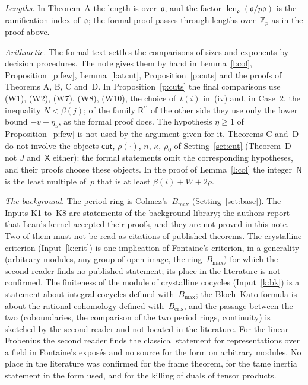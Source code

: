 \documentclass[11pt,a4paper]{article}
\newcommand{\m}[1]{\mbox{$#1$}}        %
\theoremstyle{plainx}
\theoremstyle{uprightx}
\providecommand{\Zp}{\mathbb{Z}_p}\providecommand{\Qp}{\mathbb{Q}_p}\providecommand{\GQp}{G_{\mathbb{Q}_p}}
\providecommand{\fo}{\mathfrak{o}}\providecommand{\fc}{\mathfrak{c}}\providecommand{\fd}{\mathfrak{d}}
\begin{document}
\emph{Lengths.} In Theorem~A the length is over~$\fo$, and the factor $\operatorname{len}_{\fo}(\fo/p\fo)$
is the ramification index of~$\fo$; the formal proof passes through lengths over~$\Zp$ as in the proof above.

\emph{Arithmetic.} The formal text settles the comparisons of sizes and exponents by decision procedures.
The note gives them by hand in Lemma~\ref{l:col}, Proposition~\ref{p:few}, Lemma~\ref{l:atcut},
Proposition~\ref{p:cuts} and the proofs of Theorems A, B, C and~D. In Proposition~\ref{p:cuts} the final
comparisons use (W1), (W2), (W7), (W8), (W10), the choice of~\m{t(i)} in~(iv) and, in Case~2, the inequality
\m{N<\beta(j)}; of the family \m{\mathsf{R}^{\epsilon'}} of the other side they use only the lower bound
\m{-v-\eta_\nu}, as the formal proof does. The hypothesis \m{\eta\ge1} of Proposition~\ref{p:few} is not
used by the argument given for it. Theorems C and~D do not involve the objects
$\mathsf{cut}$, $\rho(\cdot)$, $n$, $\kappa$, $\rho_0$ of Setting~\ref{set:cut} (Theorem~D not $J$ and~$\mathsf{X}$
either): the formal statements omit the corresponding hypotheses, and their proofs choose these objects. In the proof of Lemma~\ref{l:col} the integer~$\mathsf{N}$ is the least
multiple of~$p$ that is at least \m{\beta(i)+W+2\rho}.

\emph{The background.} The period ring is Colmez's~$B_{\max}$ (Setting~\ref{set:base}). The Inputs K1
to~K8 are statements of the background library; the authors report that Lean's kernel accepted their proofs,
and they are not proved in this note. Two of them must not be read as citations of published theorems.
The crystalline criterion (Input~\ref{k:crit}) is one implication of Fontaine's criterion, in a generality
(arbitrary modules, any group of open image, the ring~$B_{\max}$) for which the second reader finds no
published statement; its place in the literature is not confirmed. The finiteness of the module of crystalline
cocycles (Input~\ref{k:bk}) is a statement about integral cocycles defined with~$B_{\max}$; the Bloch--Kato
formula is about the rational cohomology defined with~$B_{\mathrm{cris}}$, and the passage between the two
(coboundaries, the comparison of the two period rings, continuity) is sketched by the second reader and not
located in the literature. For the linear Frobenius the second reader finds the classical statement for
representations over a field in Fontaine's exposés and no source for the form on arbitrary modules. No place
in the literature was confirmed for the frame theorem, for the tame inertia statement in the form used, and
for the killing of duals of tensor products.
\end{document}
